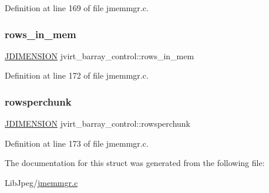 Definition at line 169 of file jmemmgr.\+c.

\mbox{\label{structjvirt__barray__control_a23aa025027bba6a29287b1460d72bf71}} 
\subsubsection{\texorpdfstring{rows\_in\_mem}{rows\_in\_mem}}
{\footnotesize\ttfamily \mbox{\hyperlink{jmorecfg_8h_a04ed4674f6f1d0d50ec241531e38274f}{J\+D\+I\+M\+E\+N\+S\+I\+ON}} jvirt\+\_\+barray\+\_\+control\+::rows\+\_\+in\+\_\+mem}



Definition at line 172 of file jmemmgr.\+c.

\mbox{\label{structjvirt__barray__control_ad31f701b81d11db2bd5fa33579d9674e}} 
\subsubsection{\texorpdfstring{rowsperchunk}{rowsperchunk}}
{\footnotesize\ttfamily \mbox{\hyperlink{jmorecfg_8h_a04ed4674f6f1d0d50ec241531e38274f}{J\+D\+I\+M\+E\+N\+S\+I\+ON}} jvirt\+\_\+barray\+\_\+control\+::rowsperchunk}



Definition at line 173 of file jmemmgr.\+c.



The documentation for this struct was generated from the following file\+:\begin{DoxyCompactItemize}
\item 
Lib\+Jpeg/\mbox{\hyperlink{jmemmgr_8c}{jmemmgr.\+c}}\end{DoxyCompactItemize}
